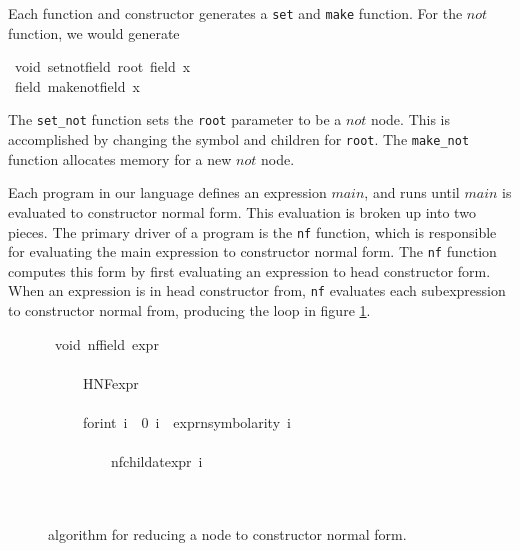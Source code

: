 \documentclass{book}
\theoremstyle{definition}
\newcommand{\Varid}[1]{\mathit{#1}}
\begin{document}
Each function and constructor generates a \texttt{set} and \texttt{make} function.
For the \ensuremath{\Varid{not}} function, we would generate 

\begin{tabbing}\ttfamily
~void~setnotfield~root~field~x\\
\ttfamily ~field~makenotfield~x
\end{tabbing}

The \texttt{set\_not} function sets the \texttt{root} parameter to be a \ensuremath{\Varid{not}} node.
This is accomplished by changing the symbol and children for \texttt{root}.
The \texttt{make\_not} function allocates memory for a new \ensuremath{\Varid{not}} node.



Each program in our language defines an expression \ensuremath{\Varid{main}},
and runs until \ensuremath{\Varid{main}} is evaluated to constructor normal form.
This evaluation is broken up into two pieces.
The primary driver of a program is the \texttt{nf} function,
which is responsible for evaluating the main expression to constructor normal form.
The \texttt{nf} function computes this form by first evaluating an expression to
head constructor form.
When an expression is in head constructor from, \texttt{nf} evaluates each subexpression
to constructor normal from, producing the loop in figure \ref{fig:nf}.

\begin{figure}
\begin{tabbing}\ttfamily
~void~nffield~expr\\
\ttfamily ~\\
\ttfamily ~~~~~HNFexpr\\
\ttfamily ~\\
\ttfamily ~~~~~forint~i~~0~i~~exprnsymbolarity~i\\
\ttfamily ~~~~~\\
\ttfamily ~~~~~~~~~nfchildatexpr~i\\
\ttfamily ~~~~~\\
\ttfamily ~
\end{tabbing}
\caption{algorithm for reducing a node to constructor normal form.}
\label{fig:nf}
\end{figure}
\end{document}
